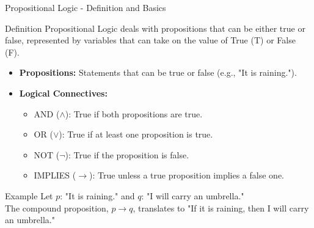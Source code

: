\documentclass[aspectratio=169]{beamer}
\begin{document}
\begin{frame}[fragile]{Propositional Logic - Definition and Basics}
\begin{block}{Definition}
Propositional Logic deals with propositions that can be either true or false, represented by variables that can take on the value of True (T) or False (F).
\end{block}

\begin{itemize}
    \item \textbf{Propositions:} Statements that can be true or false (e.g., "It is raining.").
    \item \textbf{Logical Connectives:}
    \begin{itemize}
        \item AND ($\land$): True if both propositions are true.
        \item OR ($\lor$): True if at least one proposition is true.
        \item NOT ($\neg$): True if the proposition is false.
        \item IMPLIES ($\rightarrow$): True unless a true proposition implies a false one.
    \end{itemize}
\end{itemize}

\begin{block}{Example}
Let $p$: "It is raining." and $q$: "I will carry an umbrella."\\
The compound proposition, $p \rightarrow q$, translates to "If it is raining, then I will carry an umbrella."
\end{block}
\end{frame}
\end{document}
